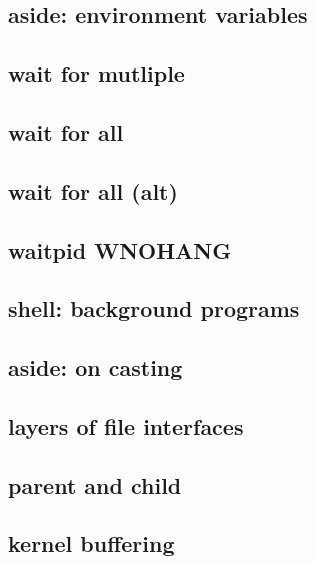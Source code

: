 \subsection{aside: environment variables}


\subsection{wait for mutliple}
 

\subsection{wait for all}


\subsection{wait for all (alt)}


\subsection{waitpid WNOHANG}


\subsection{shell: background programs}



\subsection{aside: on casting}




\subsection{layers of file interfaces}



\subsection{parent and child}



\subsection{kernel buffering}

